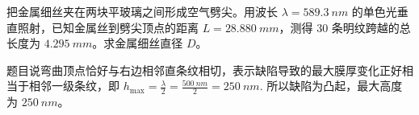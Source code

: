 \begin{exercise}[用劈尖条纹间距测金属细丝直径时为什么先写几何斜率]
把金属细丝夹在两块平玻璃之间形成空气劈尖。用波长 \(\lambda=\SI{589.3}{nm}\) 的单色光垂直照射，已知金属丝到劈尖顶点的距离 \(L=\SI{28.880}{mm}\)，测得 \(30\) 条明纹跨越的总长度为 \(\SI{4.295}{mm}\)。求金属细丝直径 \(D\)。
\end{exercise}

\begin{solution}
题目说弯曲顶点恰好与右边相邻直条纹相切，表示缺陷导致的最大膜厚变化正好相当于相邻一级条纹，即
 \(h_{\max}=\frac{\lambda}{2} =\frac{\SI{500}{nm}}{2} =\SI{250}{nm}.\) 
所以缺陷为凸起，最大高度为 \(\SI{250}{nm}\)。
\end{solution}
